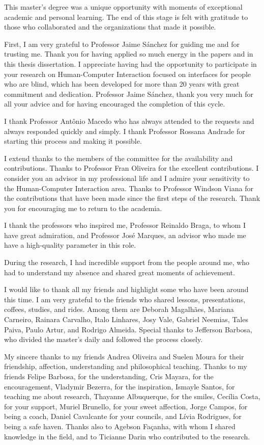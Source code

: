 This master's degree was a unique opportunity with moments of exceptional academic and personal learning. The end of this stage is felt with gratitude to those who collaborated and the organizations that made it possible.

First, I am very grateful to Professor Jaime Sánchez for guiding me and for trusting me. Thank you for having applied so much energy in the papers and in this thesis dissertation. I appreciate having had the opportunity to participate in your research on Human-Computer Interaction focused on interfaces for people who are blind, which has been developed for more than 20 years with great commitment and dedication. Professor Jaime Sánchez, thank you very much for all your advice and for having encouraged the completion of this cycle.

I thank Professor Antônio Macedo who has always attended to the requests and always responded quickly and simply. I thank Professor Rossana Andrade for starting this process and making it possible.

I extend thanks to the members of the committee for the availability and contributions. Thanks to Professor Fran Oliveira for the excellent contributions. I consider you an advisor in my professional life and I admire your sensitivity to the Human-Computer Interaction area. Thanks to Professor Windson Viana for the contributions that have been made since the first steps of the research. Thank you for encouraging me to return to the academia.

I thank the professors who inspired me, Professor Reinaldo Braga, to whom I have great admiration, and Professor José Marques, an advisor who made me have a high-quality parameter in this role.

During the research, I had incredible support from the people around me, who had to understand my absence and shared great moments of achievement.

I would like to thank all my friends and highlight some who have been around this time. I am very grateful to the friends who shared lessons, presentations, coffees, studies, and rides. Among them are Deborah Magalhães, Mariana Carneiro, Rainara Carvalho, Italo Linhares, Josy Vale, Gabriel Neemias, Tales Paiva, Paulo Artur, and Rodrigo Almeida. Special thanks to Jefferson Barbosa, who divided the master’s daily and followed the process closely.

My sincere thanks to my friends Andrea Oliveira and Suelen Moura for their friendship, affection, understanding and philosophical teaching. Thanks to my friends Felipe Barbosa, for the understanding, Cris Mayara, for the encouragement, Vladymir Bezerra, for the inspiration, Ismayle Santos, for teaching me about research, Thayanne Albuquerque, for the smiles, Cecília Costa, for your support, Muriel Brunello, for your sweet affection, Jorge Campos, for being a coach, Daniel Cavalcante for your councils, and Lívia Rodrigues, for being a safe haven. Thanks also to Agebson Façanha, with whom I shared knowledge in the field, and to Ticianne Darin who contributed to the research.


